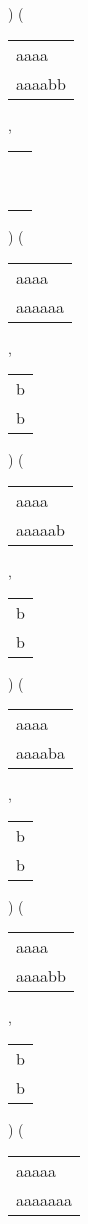 \begin{description}
\begin{tabular}{|l|}
\end{tabular} 
) 
 ( 
\begin{tabular}{|l|} \hline
aaaa\ \  \\
aaaabb \\
\hline
\end{tabular} 
 , 
\begin{tabular}{|l|} \hline
\ \\ \ \\ \hline
\end{tabular} 
) 
 ( 
\begin{tabular}{|l|} \hline
aaaa\ \  \\
aaaaaa \\
\hline
\end{tabular} 
 , 
\begin{tabular}{|l|} \hline
b \\
b \\
\hline
\end{tabular} 
) 
 ( 
\begin{tabular}{|l|} \hline
aaaa\ \  \\
aaaaab \\
\hline
\end{tabular} 
 , 
\begin{tabular}{|l|} \hline
b \\
b \\
\hline
\end{tabular} 
) 
 ( 
\begin{tabular}{|l|} \hline
aaaa\ \  \\
aaaaba \\
\hline
\end{tabular} 
 , 
\begin{tabular}{|l|} \hline
b \\
b \\
\hline
\end{tabular} 
) 
 ( 
\begin{tabular}{|l|} \hline
aaaa\ \  \\
aaaabb \\
\hline
\end{tabular} 
 , 
\begin{tabular}{|l|} \hline
b \\
b \\
\hline
\end{tabular} 
) 
 ( 
\begin{tabular}{|l|} \hline
aaaaa\ \  \\
aaaaaaa \\
\hline
\end{tabular} 

\end{description}
